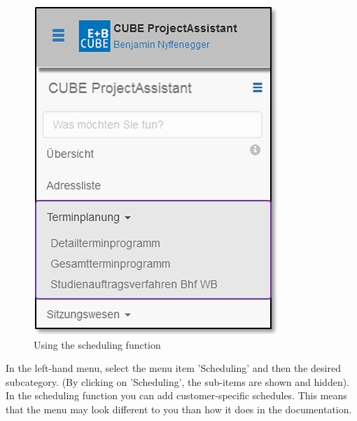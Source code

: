 \begin{figure}   %
  \vspace{-35pt}      %
  \begin{center}
    \includegraphics[width=1\linewidth]{../chapters/04_Terminplanung/pictures/4-1_Menu_Terminplanung.jpg}
  \end{center}
  \vspace{-20pt}
  \caption{Using the scheduling function}
  \vspace{-10pt}
\end{figure}

In the left-hand menu, select the menu item 'Scheduling' and then the desired subcategory. (By clicking on 'Scheduling', the sub-items are shown and hidden). In the scheduling function you can add customer-specific schedules. This means that the menu may look different to you than how it does in the documentation.

